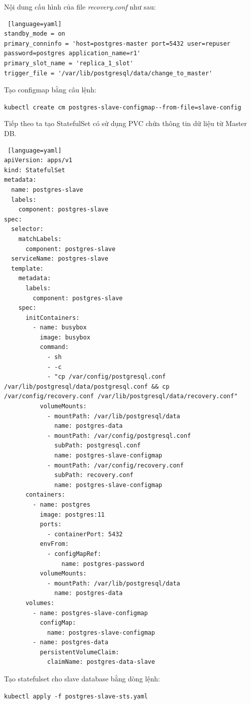 \noindent Nội dung cấu hình của file \textit{recovery.conf} như sau:
\begin{lstlisting} [language=yaml]
standby_mode = on
primary_conninfo = 'host=postgres-master port=5432 user=repuser password=postgres application_name=r1'
primary_slot_name = 'replica_1_slot'
trigger_file = '/var/lib/postgresql/data/change_to_master'
\end{lstlisting}
\noindent Tạo configmap bằng câu lệnh:
\begin{center}
  \lstinline|kubectl create cm postgres-slave-configmap--from-file=slave-config|
\end{center}

\noindent Tiếp theo ta tạo StatefulSet có sử dụng PVC chứa thông tin dữ liệu từ Master DB.
\begin{lstlisting} [language=yaml]
apiVersion: apps/v1
kind: StatefulSet
metadata:
  name: postgres-slave
  labels:
    component: postgres-slave
spec:
  selector:
    matchLabels:
      component: postgres-slave
  serviceName: postgres-slave
  template:
    metadata:
      labels:
        component: postgres-slave
    spec:
      initContainers:
        - name: busybox
          image: busybox
          command:
            - sh
            - -c
            - "cp /var/config/postgresql.conf /var/lib/postgresql/data/postgresql.conf && cp /var/config/recovery.conf /var/lib/postgresql/data/recovery.conf"
          volumeMounts:
            - mountPath: /var/lib/postgresql/data
              name: postgres-data
            - mountPath: /var/config/postgresql.conf
              subPath: postgresql.conf
              name: postgres-slave-configmap
            - mountPath: /var/config/recovery.conf
              subPath: recovery.conf
              name: postgres-slave-configmap
      containers:
        - name: postgres
          image: postgres:11
          ports:
            - containerPort: 5432
          envFrom:
            - configMapRef:
                name: postgres-password
          volumeMounts:
            - mountPath: /var/lib/postgresql/data
              name: postgres-data
      volumes:
        - name: postgres-slave-configmap
          configMap:
            name: postgres-slave-configmap
        - name: postgres-data
          persistentVolumeClaim:
            claimName: postgres-data-slave
\end{lstlisting}
\noindent Tạo statefulset cho slave database bằng dòng lệnh:
\begin{center}
  \lstinline|kubectl apply -f postgres-slave-sts.yaml|
\end{center}

